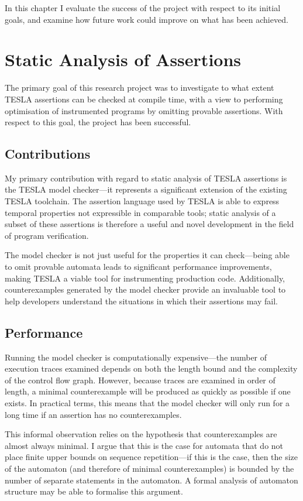In this chapter I evaluate the success of the project with respect to its
initial goals, and examine how future work could improve on what has been
achieved.

\section{Static Analysis of Assertions}

The primary goal of this research project was to investigate to what extent
TESLA assertions can be checked at compile time, with a view to performing
optimisation of instrumented programs by omitting provable assertions. With
respect to this goal, the project has been successful.

\subsection{Contributions}

My primary contribution with regard to static analysis of TESLA assertions is
the TESLA model checker---it represents a significant extension of the existing
TESLA toolchain. The assertion language used by TESLA is able to express
temporal properties not expressible in comparable tools; static analysis of a
subset of these assertions is therefore a useful and novel development in the
field of program verification.

The model checker is not just useful for the properties it can check---being
able to omit provable automata leads to significant performance improvements,
making TESLA a viable tool for instrumenting production code. Additionally,
counterexamples generated by the model checker provide an invaluable tool to
help developers understand the situations in which their assertions may fail.

\subsection{Performance}

Running the model checker is computationally expensive---the number of execution
traces examined depends on both the length bound and the complexity of the
control flow graph. However, because traces are examined in order of length, a
minimal counterexample will be produced as quickly as possible if one exists. In
practical terms, this means that the model checker will only run for a long time
if an assertion has no counterexamples.

This informal observation relies on the hypothesis that counterexamples are
almost always minimal. I argue that this is the case for automata that do not
place finite upper bounds on sequence repetition---if this is the case, then the
size of the automaton (and therefore of minimal counterexamples) is bounded by
the number of separate statements in the automaton. A formal analysis of
automaton structure may be able to formalise this argument.

